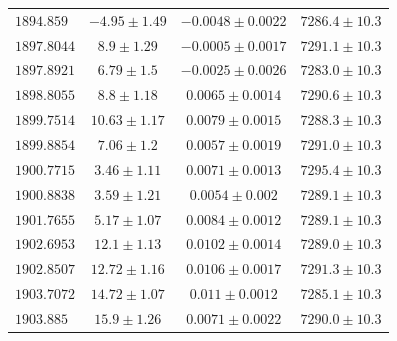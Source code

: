 \documentclass[fleqn,usenatbib]{mnras}
\begin{document}
\begin{table}
\begin{tabular}{lccc}
$1894.859$ & $-4.95\pm1.49$ & $-0.0048\pm0.0022$ & $7286.4\pm10.3$ \\
$1897.8044$ & $8.9\pm1.29$ & $-0.0005\pm0.0017$ & $7291.1\pm10.3$ \\
$1897.8921$ & $6.79\pm1.5$ & $-0.0025\pm0.0026$ & $7283.0\pm10.3$ \\
$1898.8055$ & $8.8\pm1.18$ & $0.0065\pm0.0014$ & $7290.6\pm10.3$ \\
$1899.7514$ & $10.63\pm1.17$ & $0.0079\pm0.0015$ & $7288.3\pm10.3$ \\
$1899.8854$ & $7.06\pm1.2$ & $0.0057\pm0.0019$ & $7291.0\pm10.3$ \\
$1900.7715$ & $3.46\pm1.11$ & $0.0071\pm0.0013$ & $7295.4\pm10.3$ \\
$1900.8838$ & $3.59\pm1.21$ & $0.0054\pm0.002$ & $7289.1\pm10.3$ \\
$1901.7655$ & $5.17\pm1.07$ & $0.0084\pm0.0012$ & $7289.1\pm10.3$ \\
$1902.6953$ & $12.1\pm1.13$ & $0.0102\pm0.0014$ & $7289.0\pm10.3$ \\
$1902.8507$ & $12.72\pm1.16$ & $0.0106\pm0.0017$ & $7291.3\pm10.3$ \\
$1903.7072$ & $14.72\pm1.07$ & $0.011\pm0.0012$ & $7285.1\pm10.3$ \\
$1903.885$ & $15.9\pm1.26$ & $0.0071\pm0.0022$ & $7290.0\pm10.3$ \\
\hline
\hline
\end{tabular}
\end{table}



\bsp	%
\label{lastpage}
\end{document}
